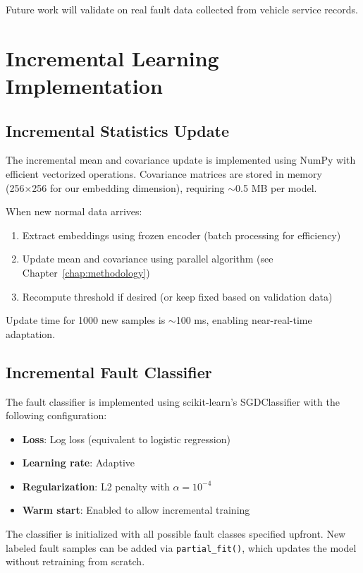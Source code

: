 Future work will validate on real fault data collected from vehicle service records.

\section{Incremental Learning Implementation}

\subsection{Incremental Statistics Update}

The incremental mean and covariance update is implemented using NumPy with efficient vectorized operations. Covariance matrices are stored in memory (256×256 for our embedding dimension), requiring $\sim$0.5 MB per model.

When new normal data arrives:
\begin{enumerate}
    \item Extract embeddings using frozen encoder (batch processing for efficiency)
    \item Update mean and covariance using parallel algorithm (see Chapter~\ref{chap:methodology})
    \item Recompute threshold if desired (or keep fixed based on validation data)
\end{enumerate}

Update time for 1000 new samples is $\sim$100 ms, enabling near-real-time adaptation.

\subsection{Incremental Fault Classifier}

The fault classifier is implemented using scikit-learn's SGDClassifier with the following configuration:

\begin{itemize}
    \item \textbf{Loss}: Log loss (equivalent to logistic regression)
    \item \textbf{Learning rate}: Adaptive
    \item \textbf{Regularization}: L2 penalty with $\alpha = 10^{-4}$
    \item \textbf{Warm start}: Enabled to allow incremental training
\end{itemize}

The classifier is initialized with all possible fault classes specified upfront. New labeled fault samples can be added via \texttt{partial\_fit()}, which updates the model without retraining from scratch.


